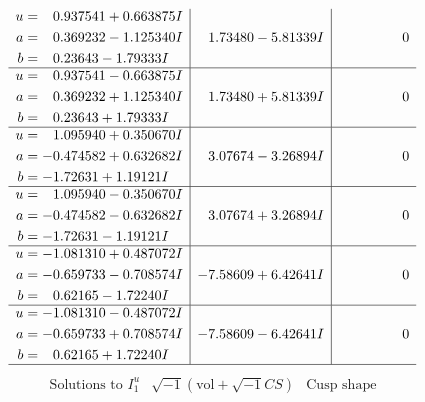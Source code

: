 \documentclass[1p]{elsarticle_modified}
\theoremstyle{definition}
\newcommand{\I}{\sqrt{-1}}
\begin{document}
$$\begin{array}{c|c|c}
\begin{aligned}
u &= \phantom{-}0.937541 + 0.663875 I \\
a &= \phantom{-}0.369232 - 1.125340 I \\
b &= \phantom{-}0.23643 - 1.79333 I\end{aligned}
 & \phantom{-}1.73480 - 5.81339 I & \phantom{-0.000000 } 0 \\ \hline\begin{aligned}
u &= \phantom{-}0.937541 - 0.663875 I \\
a &= \phantom{-}0.369232 + 1.125340 I \\
b &= \phantom{-}0.23643 + 1.79333 I\end{aligned}
 & \phantom{-}1.73480 + 5.81339 I & \phantom{-0.000000 } 0 \\ \hline\begin{aligned}
u &= \phantom{-}1.095940 + 0.350670 I \\
a &= -0.474582 + 0.632682 I \\
b &= -1.72631 + 1.19121 I\end{aligned}
 & \phantom{-}3.07674 - 3.26894 I & \phantom{-0.000000 } 0 \\ \hline\begin{aligned}
u &= \phantom{-}1.095940 - 0.350670 I \\
a &= -0.474582 - 0.632682 I \\
b &= -1.72631 - 1.19121 I\end{aligned}
 & \phantom{-}3.07674 + 3.26894 I & \phantom{-0.000000 } 0 \\ \hline\begin{aligned}
u &= -1.081310 + 0.487072 I \\
a &= -0.659733 - 0.708574 I \\
b &= \phantom{-}0.62165 - 1.72240 I\end{aligned}
 & -7.58609 + 6.42641 I & \phantom{-0.000000 } 0 \\ \hline\begin{aligned}
u &= -1.081310 - 0.487072 I \\
a &= -0.659733 + 0.708574 I \\
b &= \phantom{-}0.62165 + 1.72240 I\end{aligned}
 & -7.58609 - 6.42641 I & \phantom{-0.000000 } 0\\
 \hline 
 \end{array}$$\newpage$$\begin{array}{c|c|c}  
\text{Solutions to }I^u_{1}& \I (\text{vol} + \sqrt{-1}CS) & \text{Cusp shape}\\
 \hline 
\begin{aligned}

\end{aligned}
\end{array}$$
\end{document}

